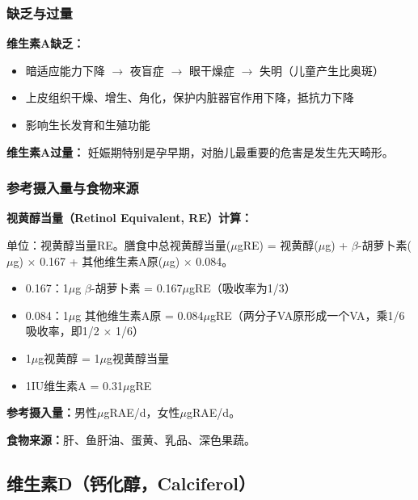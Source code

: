 \subsubsection{缺乏与过量}

\begin{tipbox}
\textbf{维生素A缺乏：}
\begin{itemize}[leftmargin=*]
    \item 暗适应能力下降 $\rightarrow$ 夜盲症 $\rightarrow$ 眼干燥症 $\rightarrow$ 失明（儿童产生比奥斑）
    \item 上皮组织干燥、增生、角化，保护内脏器官作用下降，抵抗力下降
    \item 影响生长发育和生殖功能
\end{itemize}

\textbf{维生素A过量：}
妊娠期特别是孕早期，对胎儿最重要的危害是发生先天畸形。
\end{tipbox}

\subsubsection{参考摄入量与食物来源}

\begin{keybox}
\difficulty \textbf{视黄醇当量（Retinol Equivalent, RE）计算：}

单位：视黄醇当量RE。膳食中总视黄醇当量($\mu$gRE) = 视黄醇($\mu$g) + $\beta$-胡萝卜素($\mu$g) $\times$ 0.167 + 其他维生素A原($\mu$g) $\times$ 0.084。

\begin{itemize}[leftmargin=*]
    \item 0.167：1$\mu$g $\beta$-胡萝卜素 = 0.167$\mu$gRE（吸收率为1/3）
    \item 0.084：1$\mu$g 其他维生素A原 = 0.084$\mu$gRE（两分子VA原形成一个VA，乘1/6吸收率，即1/2 $\times$ 1/6）
    \item 1$\mu$g视黄醇 = 1$\mu$g视黄醇当量
    \item 1IU维生素A = 0.31$\mu$gRE
\end{itemize}

\textbf{参考摄入量：}男性$\mu$gRAE/d，女性$\mu$gRAE/d。

\textbf{食物来源：}肝、鱼肝油、蛋黄、乳品、深色果蔬。
\end{keybox}

\subsection{维生素D（钙化醇，Calciferol）}

